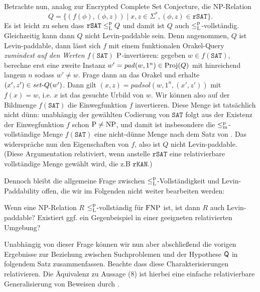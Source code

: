 Betrachte nun, analog zur Encrypted Complete Set Conjecture, die NP-Relation
\[ Q = \{ (f(\phi), (\phi, z)) \mid x,z\in\Sigma^*, (\phi,z)\in\mathtt{rSAT}\}. \]
Es ist leicht zu sehen dass $\mathtt{rSAT}\leqlp Q$ und damit ist $Q$ auch $\leqlp$-vollständig.
Gleichzeitig kann dann $Q$ nicht Levin-paddable sein.
Denn angenommen, $Q$ ist Levin-paddable, dann lässt sich $f$ mit einem funktionalen Orakel-Query \emph{zumindest auf den Werten $f(\mathtt{SAT})$} $\P$-invertieren: gegeben $w\in f(\mathtt{SAT})$, berechne erst eine zweite Instanz $w'=\mathit{pad}(w, 1^n)\in\Proj(Q)$ mit hinreichend langem $n$ sodass $w'\neq w$. Frage dann an das Orakel und erhalte $(x',z')\in \fset{}Q(w')$.
Dann gilt $(x,z) = \mathit{padsol}(w, 1^n, (x',z'))$ mit $f(x)=w$, i.e. $x$ ist das gesuchte Urbild von $w$.
Wir können also auf der Bildmenge  $f(\mathtt{SAT})$ die Einwegfunktion $f$ invertieren.
Diese Menge ist tatsächlich nicht dünn: unabhängig der gewählten Codierung von $\mathtt{SAT}$ folgt aus der Existenz der Einwegfunktion $f$ schon $\P\neq\NP$, und damit ist insbesondere die $\leqmp$-vollständige Menge $f(\mathtt{SAT})$ eine nicht-dünne Menge nach dem Satz von \textcite{mahaney_sparse_1982}.
Das widerspräche nun den Eigenschaften von $f$, also ist $Q$ nicht Levin-paddable.
(Diese Argumentation relativiert, wenn anstelle $\mathtt{rSAT}$ eine relativierbare vollständige Menge gewählt wird, die z.B $\mathtt{rKAN}$.)

Dennoch bleibt die allgemeine Frage zwischen $\leqlp$-Vollständigkeit und Levin-Paddability offen, die wir im Folgenden nicht weiter bearbeiten werden:
\begin{question}\label{question:levin-paddable}
    Wenn eine NP-Relation $R$ $\leqlp$-vollständig für $\FNP$ ist, ist dann $R$ auch Levin-paddable?
    Existiert ggf. ein Gegenbeispiel in einer geeigneten relativierten Umgebung?
\end{question}


Unabhängig von dieser Frage können wir nun aber abschließend die vorigen Ergebnisse zur Beziehung zwischen Suchproblemen und der Hypothese $\hQ$ in folgendem Satz zusammenfassen.
Beachte dass diese Charakterisierungen relativieren.
Die Äquivalenz zu Aussage (8) ist hierbei eine einfache relativierbare Generalisierung von Beweisen durch \textcite[Thm.~5.3]{messner_simulation_2001}.

